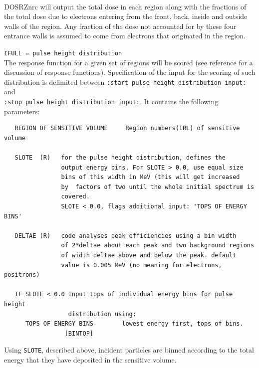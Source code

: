 \documentclass[12pt,twoside]{article}  %
\begin{document}
\\     DOSRZnrc will output the total dose
in each region along with the fractions of the total dose due to  
electrons entering from the front, back, inside and outside
walls of the region.  Any fraction of the dose not accounted for 
by these four
entrance walls is assumed to come from electrons that originated in the 
region. 

\noindent \verb+IFULL = pulse height distribution+\\
The response function for a given set of regions will be scored (see
reference\cite{Ro82} for a discussion of response functions).
Specification of the input for the scoring of such distribution
is delimited between \verb+:start pulse height distribution input:+ and\\
\verb+:stop pulse height distribution input:+. 
It contains the following parameters:
\begin{verbatim}
   REGION OF SENSITIVE VOLUME     Region numbers(IRL) of sensitive volume

   SLOTE  (R)   for the pulse height distribution, defines the
                output energy bins. For SLOTE > 0.0, use equal size
                bins of this width in MeV (this will get increased
                by  factors of two until the whole initial spectrum is
                covered.
                SLOTE < 0.0, flags additional input: 'TOPS OF ENERGY BINS'

   DELTAE (R)   code analyses peak efficiencies using a bin width
                of 2*deltae about each peak and two background regions
                of width deltae above and below the peak. default
                value is 0.005 MeV (no meaning for electrons, positrons)

   IF SLOTE < 0.0 Input tops of individual energy bins for pulse height 
                  distribution using:
      TOPS OF ENERGY BINS        lowest energy first, tops of bins.
                 [BINTOP]

\end{verbatim}
Using {\tt SLOTE}, described above, incident particles are binned according to 
the total
energy that they have deposited in the sensitive volume. 
\end{document}

